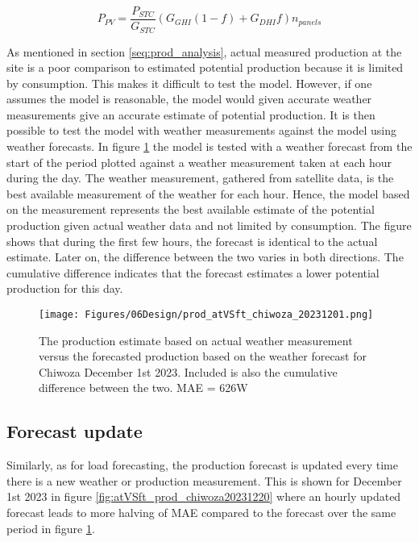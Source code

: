 \begin{equation}
    P_{PV} = \frac{P_{STC}}{G_{STC}}(G_{GHI}(1-f)+G_{DHI}f)n_{panels}
    \label{eq:pv_prod_physical_model}
\end{equation}

As mentioned in section \ref{seq:prod_analysis}, actual measured production at the site is a poor comparison to estimated potential production because it is limited by consumption. This makes it difficult to test the model. However, if one assumes the model is reasonable, the model would given accurate weather measurements give an accurate estimate of potential production. It is then possible to test the model with weather measurements against the model using weather forecasts. In figure \ref{fig:prod_atVSft_chiwoza_20231201} the model is tested with a weather forecast from the start of the period plotted against a weather measurement taken at each hour during the day. The weather measurement, gathered from satellite data\cite{met.no}, is the best available measurement of the weather for each hour. Hence, the model based on the measurement represents the best available estimate of the potential production given actual weather data and not limited by consumption. The figure shows that during the first few hours, the forecast is identical to the actual estimate. Later on, the difference between the two varies in both directions. The cumulative difference indicates that the forecast estimates a lower potential production for this day. 

\begin{figure}
    \centering
    \texttt{[image: Figures/06Design/prod\_atVSft\_chiwoza\_20231201.png]}
    \caption[Forecasted vs estimated potential production]{The production estimate based on actual weather measurement versus the forecasted production based on the weather forecast for Chiwoza December 1st 2023. Included is also the cumulative difference between the two. MAE = 626W}
    \label{fig:prod_atVSft_chiwoza_20231201}
\end{figure}


\subsection{Forecast update}
Similarly, as for load forecasting, the production forecast is updated every time there is a new weather or production measurement. This is shown for December 1st 2023 in figure \ref{fig:atVSft_prod_chiwoza20231220} where an hourly updated forecast leads to more halving of MAE compared to the forecast over the same period in figure \ref{fig:prod_atVSft_chiwoza_20231201}.


